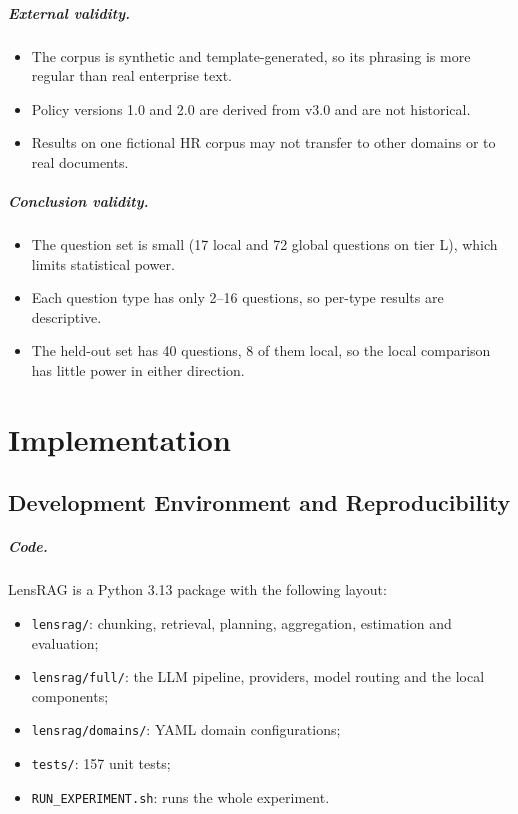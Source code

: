 \documentclass[11pt,letterpaper,oneside]{report}
\begin{document}
\paragraph{External validity.}
\begin{itemize}
  \item The corpus is synthetic and template-generated, so its phrasing is
  more regular than real enterprise text.
  \item Policy versions 1.0 and 2.0 are derived from v3.0 and are not
  historical.
  \item Results on one fictional HR corpus may not transfer to other domains
  or to real documents.
\end{itemize}

\paragraph{Conclusion validity.}
\begin{itemize}
  \item The question set is small (17 local and 72 global questions on
  tier L), which limits statistical power.
  \item Each question type has only 2--16 questions, so per-type results are
  descriptive.
  \item The held-out set has 40 questions, 8 of them local, so the local
  comparison has little power in either direction.
\end{itemize}

\chapter{Implementation}
\label{ch:implementation}

\section{Development Environment and Reproducibility}
\label{sec:impl-env}

\paragraph{Code.}
LensRAG is a Python 3.13 package with the following layout:
\begin{itemize}
  \item \texttt{lensrag/}: chunking, retrieval, planning, aggregation,
  estimation and evaluation;
  \item \texttt{lensrag/full/}: the LLM pipeline, providers, model routing
  and the local components;
  \item \texttt{lensrag/domains/}: YAML domain configurations;
  \item \texttt{tests/}: 157 unit tests;
  \item \texttt{RUN\_EXPERIMENT.sh}: runs the whole experiment.
\end{itemize}
\end{document}
